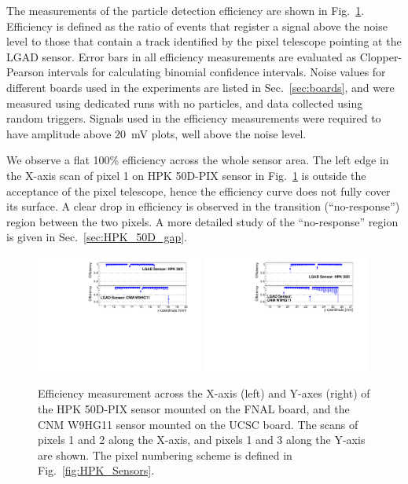 \documentclass[preprint,1p]{elsarticle}
\begin{document}
The measurements of the particle detection efficiency are shown in
Fig.~\ref{fig:FNAL_HPK50_effXY}. Efficiency is defined as the ratio of events
that register a signal above the noise level to those that contain a track
identified by the pixel telescope pointing at the LGAD sensor. Error bars in all
efficiency measurements are evaluated as Clopper-Pearson intervals for
calculating binomial confidence intervals. Noise values for different boards
used in the experiments are listed in Sec.~\ref{sec:boards}, and were measured
using dedicated runs with no particles, and data collected using random
triggers. Signals used in the efficiency measurements were required to have
amplitude above 20~mV plots, well above the noise level.

We observe a flat 100\% efficiency across the whole sensor area. The left edge
in the X-axis scan of pixel 1 on HPK 50D-PIX sensor in
Fig.~\ref{fig:FNAL_HPK50_effXY} is outside the acceptance of the pixel
telescope, hence the efficiency curve does not fully cover its surface. A clear
drop in efficiency is observed in the transition (``no-response'') region between the two pixels.
A more detailed study of the ``no-response'' region is given in Sec.~\ref{sec:HPK_50D_gap}.

\begin{figure}[htbp] 
\centering
\includegraphics[width=0.49\textwidth]{figs/HPK50DVsCNM_Efficiency_vs_X.pdf} 
\includegraphics[width=0.49\textwidth]{figs/HPK50DVsCNM_Efficiency_vs_Y.pdf} 
\caption{Efficiency measurement across the X-axis (left) and Y-axes (right) of the HPK 50D-PIX sensor 
mounted on the FNAL board, and the CNM W9HG11 sensor mounted on the UCSC board. The scans of pixels 1 and 2 
along the X-axis, and pixels 1 and 3 along the Y-axis are shown.
The pixel numbering scheme is defined in Fig.~\ref{fig:HPK_Sensors}. } 
\label{fig:FNAL_HPK50_effXY} 
\end{figure} 
\end{document}
